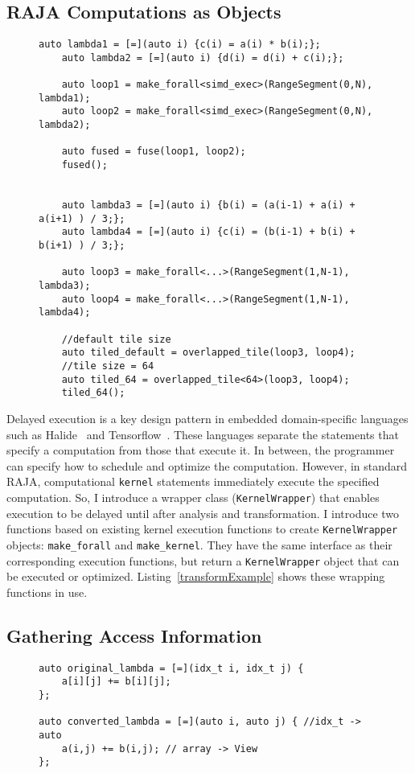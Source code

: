 \subsection{RAJA Computations as Objects}
\begin{figure}[t]
	\begin{lstlisting}[caption={Using the \texttt{fuse} and \texttt{overlapped\_tile} transformations.}, label={transformExample}]
	auto lambda1 = [=](auto i) {c(i) = a(i) * b(i);};
	auto lambda2 = [=](auto i) {d(i) = d(i) + c(i);};
	
	auto loop1 = make_forall<simd_exec>(RangeSegment(0,N), lambda1);
	auto loop2 = make_forall<simd_exec>(RangeSegment(0,N), lambda2);
	
	auto fused = fuse(loop1, loop2);
	fused();
	
	
	auto lambda3 = [=](auto i) {b(i) = (a(i-1) + a(i) + a(i+1) ) / 3;};
	auto lambda4 = [=](auto i) {c(i) = (b(i-1) + b(i) + b(i+1) ) / 3;};
	
	auto loop3 = make_forall<...>(RangeSegment(1,N-1), lambda3);
	auto loop4 = make_forall<...>(RangeSegment(1,N-1), lambda4);
	
	//default tile size
	auto tiled_default = overlapped_tile(loop3, loop4);
	//tile size = 64
	auto tiled_64 = overlapped_tile<64>(loop3, loop4);
	tiled_64();
	 \end{lstlisting}
	\end{figure}
Delayed execution is a key design pattern in %
embedded domain-specific languages such as
Halide~\cite{ragan-kelley2013halide} and Tensorflow~\cite{tensorflow}.
These languages separate the statements that specify a computation from
those that execute it.
In between, the programmer can specify how to schedule and optimize the computation.
However, in standard RAJA, computational \verb.kernel. statements immediately execute the specified computation.
So, I introduce a wrapper class (\verb.KernelWrapper.) that enables execution
to be delayed until after analysis and transformation.
I introduce two functions based on existing kernel execution functions to
create \verb.KernelWrapper. objects: \verb.make_forall. and \verb.make_kernel..
They have the same interface as their corresponding execution functions, but
return a \verb.KernelWrapper. object that can be executed or optimized.
Listing~\ref{transformExample} shows these wrapping functions in use. 


\subsection{Gathering Access Information}\label{subsec:accesses}
\begin{figure}[t]
\begin{lstlisting}[label={symExecChanges}, caption={Kernel Lambda Conversion}]
auto original_lambda = [=](idx_t i, idx_t j) {
	a[i][j] += b[i][j];
};

auto converted_lambda = [=](auto i, auto j) { //idx_t -> auto
	a(i,j) += b(i,j); // array -> View
};
\end{lstlisting}
\end{figure}

